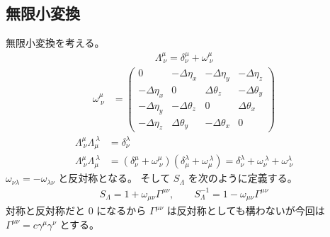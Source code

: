 \documentclass[uplatex,dvipdfmx,a4paper,11pt]{jlreq}
\theoremstyle{definition}
\numberwithin{equation}{section}
\begin{document}
\subsection{無限小変換}
無限小変換を考える。
\begin{align}
  \Lambda_{\ \nu}^\mu = \delta_\nu^\mu + \omega_{\ \nu}^\mu
\end{align}
\begin{align}
  \omega_{\ \nu}^\mu & = \begin{pmatrix}
                           0             & -\Delta\eta_x   & -\Delta\eta_y   & -\Delta\eta_z   \\
                           -\Delta\eta_x & 0               & \Delta\theta_z  & -\Delta\theta_y \\
                           -\Delta\eta_y & -\Delta\theta_z & 0               & \Delta\theta_x  \\
                           -\Delta\eta_z & \Delta\theta_y  & -\Delta\theta_x & 0
                         \end{pmatrix}
\end{align}
\begin{align}
  \Lambda_{\ \nu}^\mu\Lambda^{\ \lambda}_\mu & = \delta_\nu^\lambda                                                                                                                                        \\
  \Lambda_{\ \nu}^\mu\Lambda^{\ \lambda}_\mu & = (\delta_\nu^\mu + \omega_{\ \nu}^\mu)(\delta^\lambda_\mu + \omega^{\ \lambda}_\mu) = \delta^\lambda_\nu + \omega^{\ \lambda}_\nu + \omega_{\ \nu}^\lambda
\end{align}
$\omega_{\nu\lambda} = -\omega_{\lambda\nu}$ と反対称となる。
そして $S_\Lambda$ を次のように定義する。
\begin{align}
  S_\Lambda = 1 + \omega_{\mu\nu}\Gamma^{\mu\nu}, \qquad S_\Lambda^{-1} = 1 - \omega_{\mu\nu}\Gamma^{\mu\nu}
\end{align}
対称と反対称だと $0$ になるから $\Gamma^{\mu\nu}$ は反対称としても構わないが今回は $\Gamma^{\mu\nu} = c\gamma^\mu\gamma^\nu$ とする。
\end{document}
